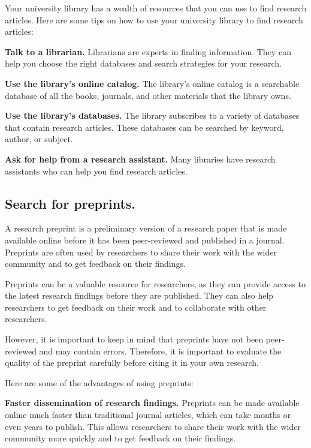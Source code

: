 \documentclass[
]{book}
\begin{document}
Your university library has a wealth of resources that you can use to find research articles. Here are some tips on how to use your university library to find research articles:

\textbf{Talk to a librarian.} Librarians are experts in finding information. They can help you choose the right databases and search strategies for your research.

\textbf{Use the library's online catalog.} The library's online catalog is a searchable database of all the books, journals, and other materials that the library owns.

\textbf{Use the library's databases.} The library subscribes to a variety of databases that contain research articles. These databases can be searched by keyword, author, or subject.

\textbf{Ask for help from a research assistant.} Many libraries have research assistants who can help you find research articles.

\subsection*{Search for preprints.}\label{search-for-preprints.}

A research preprint is a preliminary version of a research paper that is made available online before it has been peer-reviewed and published in a journal. Preprints are often used by researchers to share their work with the wider community and to get feedback on their findings.

Preprints can be a valuable resource for researchers, as they can provide access to the latest research findings before they are published. They can also help researchers to get feedback on their work and to collaborate with other researchers.

However, it is important to keep in mind that preprints have not been peer-reviewed and may contain errors. Therefore, it is important to evaluate the quality of the preprint carefully before citing it in your own research.

Here are some of the advantages of using preprints:

\textbf{Faster dissemination of research findings.} Preprints can be made available online much faster than traditional journal articles, which can take months or even years to publish. This allows researchers to share their work with the wider community more quickly and to get feedback on their findings.
\end{document}
